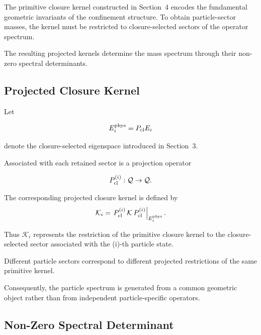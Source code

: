 \documentclass[11pt]{article}
\theoremstyle{definition}
\theoremstyle{remark}
\begin{document}
The primitive closure kernel constructed in Section~4
encodes the fundamental geometric invariants of the confinement
structure. To obtain particle-sector masses, the kernel must be
restricted to closure-selected sectors of the operator spectrum.

The resulting projected kernels determine the mass spectrum
through their non-zero spectral determinants.


\subsection{Projected Closure Kernel}
\label{subsec:projected_closure_kernel}

Let

\begin{equation}
E_i^{\rm phys} =
P_{\rm cl}E_i
\end{equation}

denote the closure-selected eigenspace introduced in
Section~3.

Associated with each retained sector is a projection operator

\begin{equation}
P_{\rm cl}^{(i)}
:
\mathcal Q
\rightarrow
\mathcal Q.
\end{equation}

The corresponding projected closure kernel is defined by
\begin{equation}
\mathcal K_i
=
\left.
P_{\rm cl}^{(i)}
\,\mathcal K\,
P_{\rm cl}^{(i)}
\right|_{E_i^{\rm phys}} .
\label{eq:projected_kernel}
\end{equation}

Thus \(\mathcal K_i\) represents the restriction of the
primitive closure kernel to the closure-selected sector
associated with the (i)-th particle state.

Different particle sectors correspond to different projected
restrictions of the same primitive kernel.

Consequently, the particle spectrum is generated from a common
geometric object rather than from independent particle-specific
operators.


\subsection{Non-Zero Spectral Determinant}
\label{subsec:nonzero_spectral_determinant}
\end{document}
